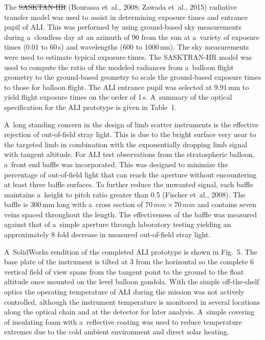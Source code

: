 \documentclass[amtd, online, hvmath]{copernicus}
\providecommand{\DIFadd}[1]{{\protect\color{blue}\uwave{#1}}} %
\providecommand{\DIFdel}[1]{{\protect\color{red}\sout{#1}}}                      %
\providecommand{\DIFaddbegin}{} %
\providecommand{\DIFaddend}{} %
\providecommand{\DIFdelbegin}{} %
\providecommand{\DIFdelend}{} %
\begin{document}
The \DIFdelbegin \DIFdel{SASKTAN-HR }\DIFdelend \DIFaddbegin \DIFadd{SASKTRAN-HR }\DIFaddend (Bourassa et~al., 2008; Zawada et~al., 2015) radiative
transfer model was used to assist in determining exposure times and
entrance pupil of ALI. This was performed by using ground-based sky
measurements during a~cloudless day at an azimuth of 90{\degree} from
the sun at a~variety of exposure times (0.01 to 60\,s) and wavelengths
(600 to 1000\,\unit{nm}). The sky measurements were used to estimate
typical exposure times. The SASKTRAN-HR model was used to compute the
ratio of the modeled radiances from a~balloon flight geometry to the
ground-based geometry to scale the ground-based exposure times to
those for balloon flight. The ALI entrance pupil was selected at
9.91\,\unit{mm} to yield flight exposure times on the order of
1\,s. A~summary of the optical specification for the ALI prototype is
given in Table~1.

A~long standing concern in the design of limb scatter instruments is
the effective rejection of out-of-field stray light. This is due to
the bright surface very near to the targeted limb in combination with
the exponentially dropping limb signal with tangent altitude. For ALI
test observations from the stratospheric balloon, a~front end baffle
was incorporated. This was designed to minimize the percentage of
out-of-field light that can reach the aperture without encountering at
least three baffle surfaces. To further reduce the unwanted signal,
each baffle maintains a~height to pitch ratio greater than 0.5
(Fischer et~al., 2008). The baffle is 300\,\unit{mm} long with a~cross
section of $70\,\unit{mm} \times 70\,\unit{mm}$ and contains seven
veins spaced throughout the length. The effectiveness of the baffle
was measured against that of a~simple aperture through laboratory
testing yielding an approximately 8 fold decrease in measured
out-of-field stray light.

A~SolidWorks rendition of the completed ALI prototype is shown in
Fig.~5.  The base plate of the instrument is tilted at 3{\degree} from
the horizontal so the complete 6{\degree} vertical field of view spans
from the tangent point to the ground to the float altitude once
mounted on the level balloon gondola.  With the simple off-the-shelf
optics the operating temperature of ALI during the mission was not
actively controlled, although the instrument temperature is monitored
in several locations along the optical chain and at the detector for
later analysis. A~simple covering of insulating foam with a~reflective
coating was used to reduce temperature extremes due to the cold
ambient environment and direct solar heating.
\end{document}
